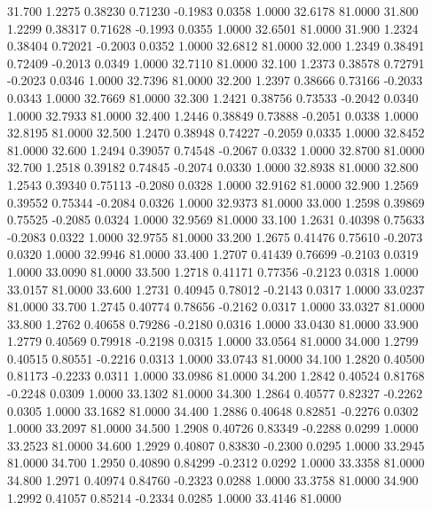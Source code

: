   31.700   1.2275   0.38230   0.71230  -0.1983   0.0358   1.0000  32.6178  81.0000
  31.800   1.2299   0.38317   0.71628  -0.1993   0.0355   1.0000  32.6501  81.0000
  31.900   1.2324   0.38404   0.72021  -0.2003   0.0352   1.0000  32.6812  81.0000
  32.000   1.2349   0.38491   0.72409  -0.2013   0.0349   1.0000  32.7110  81.0000
  32.100   1.2373   0.38578   0.72791  -0.2023   0.0346   1.0000  32.7396  81.0000
  32.200   1.2397   0.38666   0.73166  -0.2033   0.0343   1.0000  32.7669  81.0000
  32.300   1.2421   0.38756   0.73533  -0.2042   0.0340   1.0000  32.7933  81.0000
  32.400   1.2446   0.38849   0.73888  -0.2051   0.0338   1.0000  32.8195  81.0000
  32.500   1.2470   0.38948   0.74227  -0.2059   0.0335   1.0000  32.8452  81.0000
  32.600   1.2494   0.39057   0.74548  -0.2067   0.0332   1.0000  32.8700  81.0000
  32.700   1.2518   0.39182   0.74845  -0.2074   0.0330   1.0000  32.8938  81.0000
  32.800   1.2543   0.39340   0.75113  -0.2080   0.0328   1.0000  32.9162  81.0000
  32.900   1.2569   0.39552   0.75344  -0.2084   0.0326   1.0000  32.9373  81.0000
  33.000   1.2598   0.39869   0.75525  -0.2085   0.0324   1.0000  32.9569  81.0000
  33.100   1.2631   0.40398   0.75633  -0.2083   0.0322   1.0000  32.9755  81.0000
  33.200   1.2675   0.41476   0.75610  -0.2073   0.0320   1.0000  32.9946  81.0000
  33.400   1.2707   0.41439   0.76699  -0.2103   0.0319   1.0000  33.0090  81.0000
  33.500   1.2718   0.41171   0.77356  -0.2123   0.0318   1.0000  33.0157  81.0000
  33.600   1.2731   0.40945   0.78012  -0.2143   0.0317   1.0000  33.0237  81.0000
  33.700   1.2745   0.40774   0.78656  -0.2162   0.0317   1.0000  33.0327  81.0000
  33.800   1.2762   0.40658   0.79286  -0.2180   0.0316   1.0000  33.0430  81.0000
  33.900   1.2779   0.40569   0.79918  -0.2198   0.0315   1.0000  33.0564  81.0000
  34.000   1.2799   0.40515   0.80551  -0.2216   0.0313   1.0000  33.0743  81.0000
  34.100   1.2820   0.40500   0.81173  -0.2233   0.0311   1.0000  33.0986  81.0000
  34.200   1.2842   0.40524   0.81768  -0.2248   0.0309   1.0000  33.1302  81.0000
  34.300   1.2864   0.40577   0.82327  -0.2262   0.0305   1.0000  33.1682  81.0000
  34.400   1.2886   0.40648   0.82851  -0.2276   0.0302   1.0000  33.2097  81.0000
  34.500   1.2908   0.40726   0.83349  -0.2288   0.0299   1.0000  33.2523  81.0000
  34.600   1.2929   0.40807   0.83830  -0.2300   0.0295   1.0000  33.2945  81.0000
  34.700   1.2950   0.40890   0.84299  -0.2312   0.0292   1.0000  33.3358  81.0000
  34.800   1.2971   0.40974   0.84760  -0.2323   0.0288   1.0000  33.3758  81.0000
  34.900   1.2992   0.41057   0.85214  -0.2334   0.0285   1.0000  33.4146  81.0000
